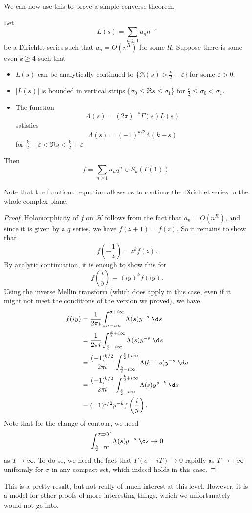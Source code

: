 \documentclass[a4paper]{article}
\renewcommand{\H}{\mathcal{H}}
\begin{document}
We can now use this to prove a simple converse theorem.
\begin{thm}
  Let
  \[
    L(s) = \sum_{n \geq 1} a_n n^{-s}
  \]
  be a Dirichlet series such that $a_n = O(n^R)$ for some $R$. Suppose there is some even $k \geq 4$ such that
  \begin{itemize}
    \item $L(s)$ can be analytically continued to $\{\Re(s) > \frac{k}{2} - \varepsilon\}$ for some $\varepsilon > 0$;
    \item $|L(s)|$ is bounded in vertical strips $\{\sigma_0 \leq \Re s \leq \sigma_1\}$ for $\frac{k}{2} \leq \sigma_0 < \sigma_1$.
    \item The function
      \[
        \Lambda(s) = (2\pi)^{-s} \Gamma(s) L(s)
      \]
      satisfies
      \[
        \Lambda(s) = (-1)^{k/2} \Lambda(k - s)
      \]
      for $\frac{k}{2} - \varepsilon < \Re s < \frac{k}{2} + \varepsilon$.
  \end{itemize}
  Then
  \[
    f = \sum_{n \geq 1} a_n q^n \in S_k(\Gamma(1)).
  \]
\end{thm}
Note that the functional equation allows us to continue the Dirichlet series to the whole complex plane.

\begin{proof}
  Holomorphicity of $f$ on $\H$ follows from the fact that $a_n = O(n^R)$, and since it is given by a $q$ series, we have $f(z + 1) = f(z)$. So it remains to show that
  \[
    f\left(-\frac{1}{z}\right) = z^k f(z).
  \]
  By analytic continuation, it is enough to show this for
  \[
    f\left(\frac{i}{y}\right) = (iy)^k f(iy).
  \]
  Using the inverse Mellin transform (which does apply in this case, even if it might not meet the conditions of the version we proved), we have
  \begin{align*}
    f(iy) &= \frac{1}{2\pi i} \int_{\sigma - i \infty}^{\sigma + i \infty} \Lambda(s) y^{-s}\;\d s \\
    &= \frac{1}{2\pi i} \int_{\frac{k}{2} - i \infty}^{\frac{k}{2} + i \infty} \Lambda(s) y^{-s}\;\d s\\
    &= \frac{(-1)^{k/2}}{2\pi i} \int_{\frac{k}{2} - i\infty}^{\frac{k}{2} + i \infty} \Lambda(k - s) y^{-s}\;\d s\\
    &= \frac{(-1)^{k/2}}{2\pi i}\int_{\frac{k}{2} - i\infty}^{\frac{k}{2} + i\infty} \Lambda(s) y^{s - k}\;\d s\\
    &= (-1)^{k/2} y^{-k}f\left(\frac{i}{y}\right).
  \end{align*}
  Note that for the change of contour, we need
  \[
    \int_{\frac{k}{2} \pm iT }^{\sigma \pm iT} \Lambda(s) y^{-s}\;\d s \to 0
  \]
  as $T \to \infty$. To do so, we need the fact that $\Gamma(\sigma + iT) \to 0$ rapidly as $T \to \pm \infty$ uniformly for $\sigma$ in any compact set, which indeed holds in this case.
\end{proof}
This is a pretty result, but not really of much interest at this level. However, it is a model for other proofs of more interesting things, which we unfortunately would not go into.
\end{document}
